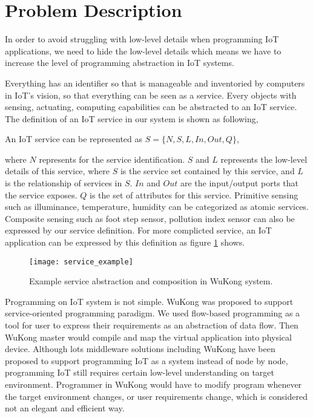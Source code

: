 \section{Problem Description}
\label{c:prob_desc}


In order to avoid struggling with low-level details when programming IoT applications, we need to hide the low-level details which means we have to increase the level of programming abstraction in IoT systems. 

Everything has an identifier so that is manageable and inventoried by computers in IoT's vision, so that everything can be seen as a service\cite{Perera2014}. Every objects with sensing, actuating, computing capabilities can be abstracted to an IoT service. The definition of an IoT service in our system is shown as following, 

\begin{defn}
An IoT service can be represented as $S = \lbrace N, S, L, In, Out, Q \rbrace $,
\end{defn}

where $N$ represents for the service identification. $S$ and $L$ represents the low-level details of this service, where $S$ is the service set contained by this service, and $L$ is the relationship of services in $S$. $In$ and $Out$ are the input/output ports that the service exposes. $Q$ is the set of attributes for this service. Primitive sensing such as illuminance, temperature, humidity can be categorized as atomic services. Composite sensing such as foot step sensor, pollution index sensor can also be expressed by our service definition. For more complicted service, an IoT application can be expressed by this definition as figure \ref{fig_service_example} shows.

\begin{figure}[!t]
\centering
\texttt{[image: service\_example]}
\caption{Example service abstraction and composition in WuKong system.}
\label{fig_service_example}
\end{figure}


Programming on IoT system is not simple. WuKong was proposed to support service-oriented programming paradigm\cite{Lin2013}. We used flow-based programming as a tool for user to express their requirements as an abstraction of data flow. Then WuKong master would compile and map the virtual application into physical device.  Although lots middleware solutions including WuKong have been proposed to support programming IoT as a system instead of node by node, programming IoT still requires certain low-level understanding on target environment. Programmer in WuKong would have to modify program whenever the target environment changes, or user requirements change, which is considered not an elegant and efficient way. 

